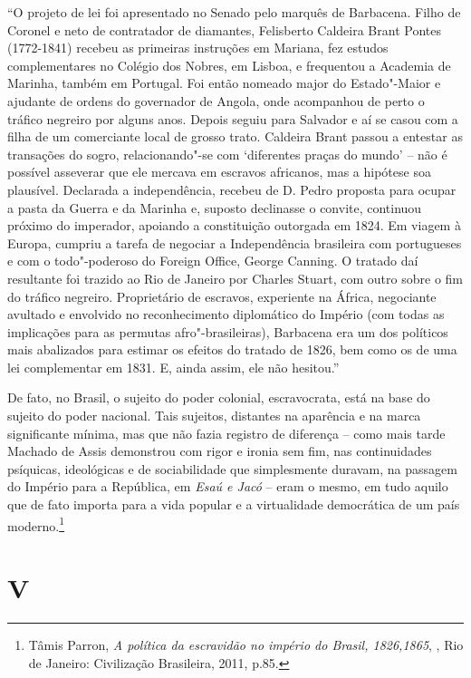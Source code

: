 ``O projeto de lei foi apresentado no Senado pelo marquês de Barbacena.
Filho de Coronel e neto de contratador de diamantes, Felisberto Caldeira
Brant Pontes (1772-1841) recebeu as primeiras instruções em Mariana, fez
estudos complementares no Colégio dos Nobres, em Lisboa, e frequentou a
Academia de Marinha, também em Portugal. Foi então nomeado major do
Estado"-Maior e ajudante de ordens do governador de Angola, onde
acompanhou de perto o tráfico negreiro por alguns anos. Depois seguiu
para Salvador e aí se casou com a filha de um comerciante local de
grosso trato. Caldeira Brant passou a entestar as transações do sogro,
relacionando"-se com `diferentes praças do mundo' -- não é possível
asseverar que ele mercava em escravos africanos, mas a hipótese soa
plausível. Declarada a independência, recebeu de D. Pedro  proposta
para ocupar a pasta da Guerra e da Marinha e, suposto declinasse o
convite, continuou próximo do imperador, apoiando a constituição
outorgada em 1824. Em viagem à Europa, cumpriu a tarefa de negociar a
Independência brasileira com portugueses e com o todo"-poderoso do
Foreign Office, George Canning. O tratado daí resultante foi trazido ao
Rio de Janeiro por Charles Stuart, com outro sobre o fim do tráfico
negreiro. Proprietário de escravos, experiente na África, negociante
avultado e envolvido no reconhecimento diplomático do Império (com todas
as implicações para as permutas afro"-brasileiras), Barbacena era um dos
políticos mais abalizados para estimar os efeitos do tratado de 1826,
bem como os de uma lei complementar em 1831. E, ainda assim, ele não
hesitou.''

De fato, no Brasil, o sujeito do poder colonial, escravocrata, está na
base do sujeito do poder nacional. Tais sujeitos, distantes na aparência
e na marca significante mínima, mas que não fazia registro de diferença
-- como mais tarde Machado de Assis demonstrou com rigor e ironia sem
fim, nas continuidades psíquicas, ideológicas e de sociabilidade que
simplesmente duravam, na passagem do Império para a República, em
\emph{Esaú e Jacó} -- eram o mesmo, em tudo aquilo que de fato importa
para a vida popular e a virtualidade democrática de um país
moderno.\footnote{Tâmis Parron, \emph{A política da escravidão no
  império do Brasil, 1826,1865}, , Rio de Janeiro: Civilização
  Brasileira, 2011, p.85.}

\section{V}

